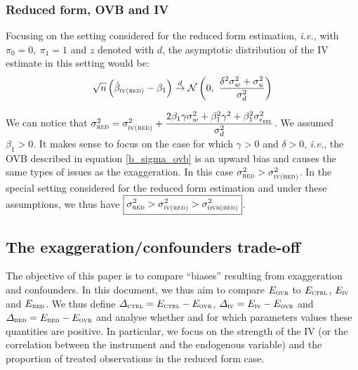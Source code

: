\documentclass[a4paper, 11pt]{report}
\begin{document}
			\subsubsection{Reduced form, OVB and IV}
			
			Focusing on the setting considered for the reduced form estimation, \textit{i.e.}, with $\pi_{0} = 0, \ \pi_{1} = 1$ and $z$ denoted with $d$, the asymptotic distribution of the IV estimate in this setting would be: 
			~
			\[
				\sqrt{n}\left( \hat{\beta}_{\textsc{iv(red)}} - \beta_{1} \right)
					\overset{d}{\to}
					 \mathcal{N}\left( 0 , \ \dfrac{\delta^{2}\sigma_{w}^{2} + \sigma_{u}^{2}}{ \sigma_{d}^{2}} \right) 
			\]
			
			We can notice that $\sigma_{\textsc{red}}^{2} =\sigma_{\textsc{iv(red)}}^{2} + \dfrac{2\beta_{1}\gamma \sigma_{w}^{2} + \beta_{1}^{2}\gamma^{2} + \beta_{1}^{2}\sigma_{\epsilon_{\textsc{red}}}^{2}}{\sigma_{d}^{2}}$. We assumed $\beta_{1} > 0$. It makes sense to focus on the case for which $\gamma > 0$ and  $\delta > 0$, \textit{i.e.}, the OVB described in equation \ref{b_sigma_ovb} is an upward bias and causes the same types of issues as the exaggeration. In this case $\sigma_{\textsc{red}}^{2} > \sigma_{\textsc{iv(red)}}^{2}$. In the special setting considered for the reduced form estimation and under these assumptions, we thus have $\boxed{\sigma_{\textsc{red}}^{2} > \sigma_{\textsc{iv(red)}}^{2} > \sigma_{\textsc{ovb(red)}}^{2}}$.


			
                		\subsection{The exaggeration/confounders trade-off}
                		
                			The objective of this paper is to compare ``biases'' resulting from exaggeration and confounders. In this document, we thus aim to compare $E_{\textsc{ovb}}$ to $E_{\textsc{ctrl}}$, $E_{\textsc{iv}}$ and $E_{\textsc{red}}$. We thus define $\varDelta_{\textsc{ctrl}} = E_{\textsc{ctrl}} - E_{\textsc{ovb}}$, $\varDelta_{\textsc{iv}} = E_{\textsc{iv}} - E_{\textsc{ovb}}$ and $\varDelta_{\textsc{red}} = E_{\textsc{red}} - E_{\textsc{ovb}}$ and analyse whether and for which parameters values these quantities are positive. In particular, we focus on the strength of the IV (or the correlation between the instrument and the endogenous variable) and the proportion of treated observations in the reduced form case. 
			
\end{document}
